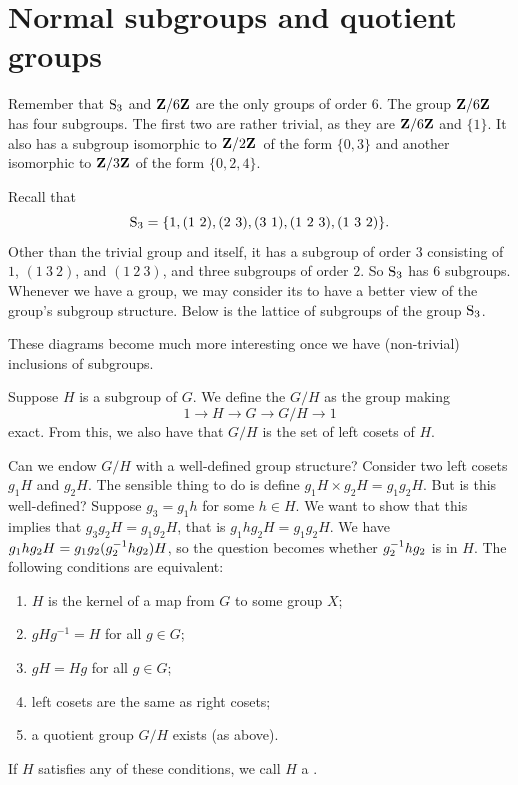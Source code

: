 \documentclass[11pt, oneside]{amsart}
\begin{document}
\section{Normal subgroups and quotient groups}
Remember that $\operatorname{S}_3$ and $\mathbf Z/6\mathbf Z$ are the only groups of order $6$. The group $\mathbf Z/6\mathbf Z$ has four subgroups. The first two are rather trivial, as they are $\mathbf Z/6\mathbf Z$ and $\{1\}$. It also has a subgroup isomorphic to $\mathbf Z/2\mathbf Z$\ of the form $\{0,3\}$ and another isomorphic to $\mathbf Z/3\mathbf Z$ of the form $\{0,2,4\}$. 

Recall that 
$$
\operatorname{S}_3 = \{ 1, (1\ 2), (2\ 3) , (3\ 1), (1\ 2\ 3), (1\ 3\ 2)\}.
$$
Other than the trivial group and itself, it has a subgroup of order $3$ consisting of $1$, $(1\ 3\ 2)$, and $(1\ 2\ 3)$, and three subgroups of order $2$. So $\operatorname{S}_3$ has $6$ subgroups. Whenever we have a group, we may consider its  to have a better view of the group's subgroup structure. Below is the lattice of subgroups of the group $\operatorname{S}_3$.
\begin{center}
\end{center}
These diagrams become much more interesting once we have (non-trivial) inclusions of subgroups.

Suppose $H$ is a subgroup of $G$. We define the  $G/H$ as the group making
$$
1\longrightarrow H\longrightarrow G \longrightarrow G/H\longrightarrow 1
$$
exact. From this, we also have that $G/H$ is the set of left cosets of $H$. 

Can we endow $G/H$ with a well-defined group structure? Consider two left cosets $g_1H$ and $g_2H$. The sensible thing to do is define $g_1H \times g_2H = g_1g_2H$. But is this well-defined? Suppose $g_3=g_1h$ for some $h\in H$. We want to show that this implies that $g_3g_2 H = g_1g_2H$, that is $g_1hg_2H = g_1g_2H$. We have $g_1hg_2H = g_1g_2(g_2^{-1} h g_2) H$, so the question becomes whether $g_2^{-1} hg_2$ is in $H$. The following conditions are equivalent:
\begin{enumerate}
\item $H$ is the kernel of a map from $G$ to some group $X$;
\item $gHg^{-1} = H$ for all $g\in G$;
\item $gH = Hg$ for all $g\in G$;
\item left cosets are the same as right cosets;
\item a quotient group $G/H$ exists (as above).
\end{enumerate}
If $H$ satisfies any of these conditions, we call $H$ a .
\end{document}
